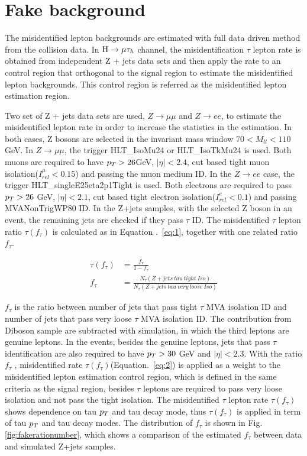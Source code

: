 \documentclass[final,numrefs,sort&compress,twoadvisors]{nddiss2e}
\begin{document}
 




\chapter{Fake background}

The misidentified lepton backgrounds are estimated with full data driven method from the collision data. In $\mathrm{H}\to \mu\tau_{h}$ channel,  the misidentification $\tau$ lepton rate is obtained from independent Z + jets data sets and then apply the rate to an control region that orthogonal to the signal region to estimate the misidentified lepton backgrounds. This control region is referred as the misidentified lepton estimation region. 

Two set of Z + jets data sets are used, $Z\rightarrow\mu\mu$ and $Z\rightarrow e e$, to estimate the misidentified lepton rate in order to increase the statistics in the estimation.  In both cases, Z bosons are selected in the invariant mass window $70<M_{ll}<110$ GeV. In $Z\rightarrow\mu\mu$, the trigger HLT\_IsoMu24 or HLT\_IsoTkMu24 is used. Both muons are required to have $p_{T}>26$GeV, $|\eta|<2.4$, cut based tight muon isolation($I^{\mu}_{rel}<0.15$) and passing the muon medium ID. In the $Z\rightarrow e e$ case, the trigger HLT\_singleE25eta2p1Tight is used. Both electrons are required to pass $p_{T}>26$ GeV, $|\eta|<2.1$, cut based tight electron isolation($I^{e}_{rel}<0.1$) and passing MVANonTrigWP80 ID. In the Z+jets samples, with the selected Z boson in an event, the remaining jets are checked if they pass $\tau$ ID. The misidentified $\tau$ lepton ratio $\tau(f_{\tau})$ is calculated as in Equation .~\ref{eq:1}, together with one related ratio $f_{\tau}$.

\begin{align} 
\tau(f_{\tau})&=\frac{f_{\tau}}{1-f_{\tau}} \label{eq:1}\\
f_{\tau}&=\frac{N_{\tau}(Z+jets\ tau\ tight\ Iso)}{N_{\tau}(Z+jets\ tau\ very\ loose\ Iso)} \label{eq:2}
\end{align}

$f_{\tau}$ is the ratio between number of jets that pass tight $\tau$ MVA isolation ID and number of jets that pass very loose $\tau$ MVA isolation ID. The contribution from Diboson sample are subtracted with simulation, in which the third leptons are genuine leptons. In the events, besides the genuine leptons, jets that pass $\tau$ identification are also required to have $p_{T}>30$ GeV and $|\eta|<2.3$. With the ratio $f_{\tau}$ , misidentified rate $\tau(f_{\tau})$(Equation.~\ref{eq:2}) is applied as a weight to the misidentified lepton estimation control region, which is defined in the same criteria as the signal region, besides $\tau$ leptons are required to pass very loose isolation and not pass the tight isolation. The misidentified $\tau$ lepton rate $\tau(f_{\tau})$ shows dependence on tau $p_{T}$ and tau decay mode, thus $\tau(f_{\tau})$ is applied in term of tau $p_{T}$ and tau decay modes. The distribution of $f_{\tau}$ is shown in Fig.~ \ref{fig:fakerationumber}, which shows a comparison of the estimated $f_{\tau}$ between data and simulated Z+jets samples. 
\end{document}
